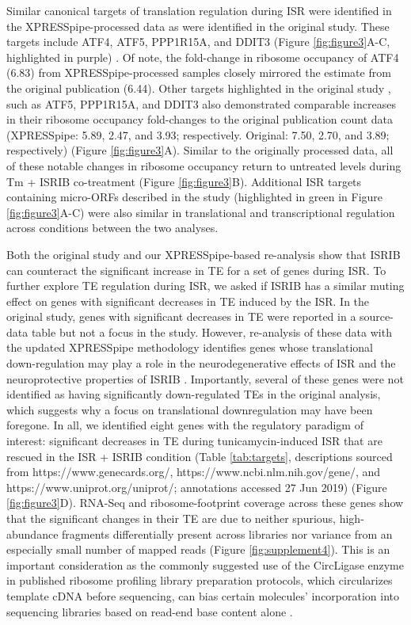 \documentclass[10pt, oneside]{article}
\begin{document}
Similar canonical targets of translation regulation during ISR were identified in the XPRESSpipe-processed data as were identified in the original study. These targets include ATF4, ATF5, PPP1R15A, and DDIT3 (Figure \ref{fig:figure3}A-C, highlighted in purple) \cite{isrib_riboseq}. Of note, the fold-change in ribosome occupancy of ATF4 (6.83) from XPRESSpipe-processed samples closely mirrored the estimate from the original publication (6.44). Other targets highlighted in the original study \cite{isrib_riboseq}, such as ATF5, PPP1R15A, and DDIT3 also demonstrated comparable increases in their ribosome occupancy fold-changes to the original publication count data (XPRESSpipe: 5.89, 2.47, and 3.93; respectively. Original: 7.50, 2.70, and 3.89; respectively) (Figure \ref{fig:figure3}A). Similar to the originally processed data, all of these notable changes in ribosome occupancy return to untreated levels during Tm + ISRIB co-treatment (Figure \ref{fig:figure3}B). Additional ISR targets containing micro-ORFs described in the study (highlighted in green in Figure \ref{fig:figure3}A-C) were also similar in translational and transcriptional regulation across conditions between the two analyses. \par

Both the original study and our XPRESSpipe-based re-analysis show that ISRIB can counteract the significant increase in TE for a set of genes during ISR. To further explore TE regulation during ISR, we asked if ISRIB has a similar muting effect on genes with significant decreases in TE induced by the ISR. In the original study, genes with significant decreases in TE were reported in a source-data table but not a focus in the study. However, re-analysis of these data with the updated XPRESSpipe methodology identifies genes whose translational down-regulation may play a role in the neurodegenerative effects of ISR and the neuroprotective properties of ISRIB \cite{isrib_neuroprotective,isrib_neuroprotective2,isrib_neuroprotective3,isrib_neuroprotective4}. Importantly, several of these genes were not identified as having significantly down-regulated TEs in the original analysis, which suggests why a focus on translational downregulation may have been foregone. In all, we identified eight genes with the regulatory paradigm of interest: significant decreases in TE during tunicamycin-induced ISR that are rescued in the ISR + ISRIB condition (Table \ref{tab:targets}, descriptions sourced from https://www.genecards.org/, https://www.ncbi.nlm.nih.gov/gene/, and https://www.uniprot.org/uniprot/; annotations accessed 27 Jun 2019) (Figure \ref{fig:figure3}D). RNA-Seq and ribosome-footprint coverage across these genes show that the significant changes in their TE are due to neither spurious, high-abundance fragments differentially present across libraries nor variance from an especially small number of mapped reads (Figure \ref{fig:supplement4}). This is an important consideration as the commonly suggested use of the CircLigase enzyme in published ribosome profiling library preparation protocols, which circularizes template cDNA before sequencing, can bias certain molecules' incorporation into sequencing libraries based on read-end base content alone \cite{circligase_bias}. \par
\end{document}
